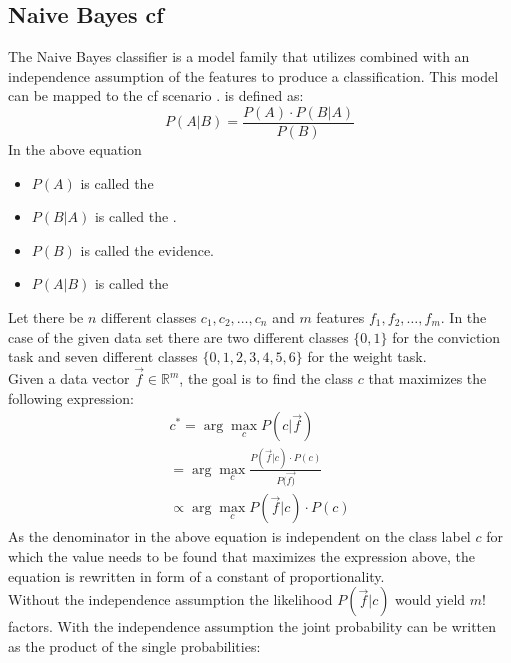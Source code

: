 \subsection{Naive Bayes \acrshort{cf}}
The Naive Bayes classifier is a model family that utilizes  combined with an independence assumption of the features to produce a classification. This model can be mapped to the \acrshort{cf} scenario \cite{valdiviezo2019collaborative}.  is defined as:\\
\begin{equation}
    P(A|B) = \frac{P(A)\cdot P(B|A)}{P(B)}
\end{equation}
In the above equation
\begin{itemize}
    \item $P(A)$ is called the 
    \item $P(B|A)$ is called the .
    \item $P(B)$ is called the evidence.
    \item $P(A|B)$ is called the 
\end{itemize}
Let there be $n$ different classes $c_1, c_2,\dots,c_n$ and $m$ features $f_1, f_2,\dots,f_m$.
In the case of the given data set there are two different classes $\{0,1\}$ for the conviction task and
seven different classes $\{0,1,2,3,4,5,6\}$ for the weight task.\\
Given a data vector $\Vec{f} \in \mathbb{R}^{m}$, the goal is to find the class $c$ that maximizes the following expression:\\
\begin{equation}
    \begin{align*}
        c^{*} = \arg\max_{c} P(c|\Vec{f})\\
        = \arg\max_{c} \frac{P(\Vec{f}|c)\cdot P(c)}{P(\Vec{f)}}\\
        \propto \arg\max_{c} P(\Vec{f}|c)\cdot P(c) \label{eq:1}  
    \end{align*}
\end{equation}
As the denominator in the above equation is independent on the class label $c$ for which the value needs to be found that maximizes the expression above, the equation is rewritten in form of a constant of proportionality.\\
Without the independence assumption the likelihood $P(\Vec{f}|c)$ would yield $m!$ factors.
With the independence assumption the joint probability can be written as the product of the single probabilities:
